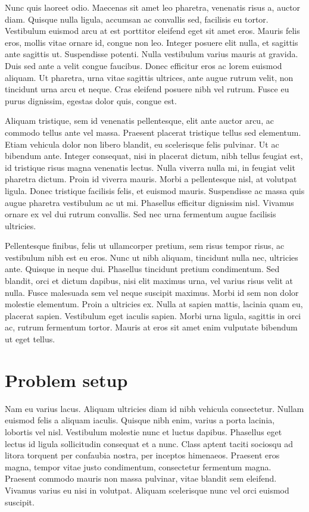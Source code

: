 \documentclass{article}
\begin{document}
Nunc quis laoreet odio. Maecenas sit amet leo pharetra, venenatis risus a, auctor diam. Quisque nulla ligula, accumsan ac convallis sed, facilisis eu tortor. Vestibulum euismod arcu at est porttitor eleifend eget sit amet eros. Mauris felis eros, mollis vitae ornare id, congue non leo. Integer posuere elit nulla, et sagittis ante sagittis ut. Suspendisse potenti. Nulla vestibulum varius mauris at gravida. Duis sed ante a velit congue faucibus. Donec efficitur eros ac lorem euismod aliquam. Ut pharetra, urna vitae sagittis ultrices, ante augue rutrum velit, non tincidunt urna arcu et neque. Cras eleifend posuere nibh vel rutrum. Fusce eu purus dignissim, egestas dolor quis, congue est.

Aliquam tristique, sem id venenatis pellentesque, elit ante auctor arcu, ac commodo tellus ante vel massa. Praesent placerat tristique tellus sed elementum. Etiam vehicula dolor non libero blandit, eu scelerisque felis pulvinar. Ut ac bibendum ante. Integer consequat, nisi in placerat dictum, nibh tellus feugiat est, id tristique risus magna venenatis lectus. Nulla viverra nulla mi, in feugiat velit pharetra dictum. Proin id viverra mauris. Morbi a pellentesque nisl, at volutpat ligula. Donec tristique facilisis felis, et euismod mauris. Suspendisse ac massa quis augue pharetra vestibulum ac ut mi. Phasellus efficitur dignissim nisl. Vivamus ornare ex vel dui rutrum convallis. Sed nec urna fermentum augue facilisis ultricies.

Pellentesque finibus, felis ut ullamcorper pretium, sem risus tempor risus, ac vestibulum nibh est eu eros. Nunc ut nibh aliquam, tincidunt nulla nec, ultricies ante. Quisque in neque dui. Phasellus tincidunt pretium condimentum. Sed blandit, orci et dictum dapibus, nisi elit maximus urna, vel varius risus velit at nulla. Fusce malesuada sem vel neque suscipit maximus. Morbi id sem non dolor molestie elementum. Proin a ultricies ex. Nulla at sapien mattis, lacinia quam eu, placerat sapien. Vestibulum eget iaculis sapien. Morbi urna ligula, sagittis in orci ac, rutrum fermentum tortor. Mauris at eros sit amet enim vulputate bibendum ut eget tellus.

\section{Problem setup}
Nam eu varius lacus. Aliquam ultricies diam id nibh vehicula consectetur. Nullam euismod felis a aliquam iaculis. Quisque nibh enim, varius a porta lacinia, lobortis vel nisl. Vestibulum molestie nunc et luctus dapibus. Phasellus eget lectus id ligula sollicitudin consequat et a nunc. Class aptent taciti sociosqu ad litora torquent per confaubia nostra, per inceptos himenaeos. Praesent eros magna, tempor vitae justo condimentum, consectetur fermentum magna. Praesent commodo mauris non massa pulvinar, vitae blandit sem eleifend. Vivamus varius eu nisi in volutpat. Aliquam scelerisque nunc vel orci euismod suscipit.
\end{document}
